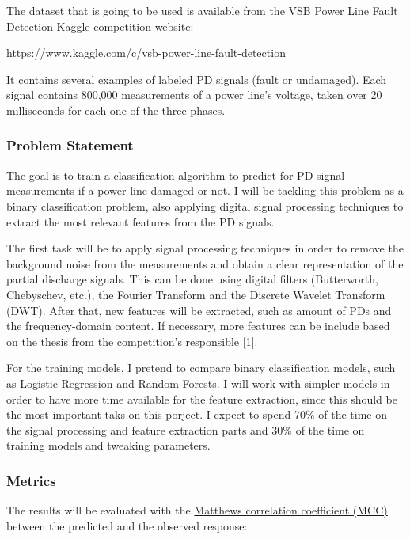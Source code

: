 \documentclass[11pt]{article}
\begin{document}
The dataset that is going to be used is available from the VSB Power
Line Fault Detection Kaggle competition website:

https://www.kaggle.com/c/vsb-power-line-fault-detection

It contains several examples of labeled PD signals (fault or undamaged).
Each signal contains 800,000 measurements of a power line's voltage,
taken over 20 milliseconds for each one of the three phases.

\hypertarget{problem-statement}{%
\subsubsection{Problem Statement}\label{problem-statement}}

The goal is to train a classification algorithm to predict for PD signal
measurements if a power line damaged or not. I will be tackling this
problem as a binary classification problem, also applying digital signal
processing techniques to extract the most relevant features from the PD
signals.

The first task will be to apply signal processing techniques in order to
remove the background noise from the measurements and obtain a clear
representation of the partial discharge signals. This can be done using
digital filters (Butterworth, Chebyschev, etc.), the Fourier Transform
and the Discrete Wavelet Transform (DWT). After that, new features will
be extracted, such as amount of PDs and the frequency-domain content. If
necessary, more features can be include based on the thesis from the
competition's responsible {[}1{]}.

For the training models, I pretend to compare binary classification
models, such as Logistic Regression and Random Forests. I will work with
simpler models in order to have more time available for the feature
extraction, since this should be the most important taks on this
porject. I expect to spend 70\% of the time on the signal processing and
feature extraction parts and 30\% of the time on training models and
tweaking parameters.

\hypertarget{metrics}{%
\subsubsection{Metrics}\label{metrics}}

The results will be evaluated with the
\href{https://en.wikipedia.org/wiki/Matthews_correlation_coefficient}{Matthews
correlation coefficient (MCC)} between the predicted and the observed
response:
\end{document}
